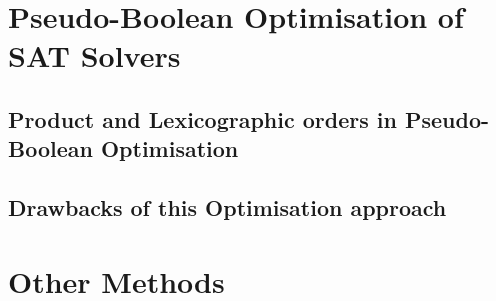 \section{Pseudo-Boolean Optimisation of SAT Solvers}



\subsection{Product and Lexicographic orders in Pseudo-Boolean Optimisation}

\subsection{Drawbacks of this Optimisation approach}






\section{Other Methods}
